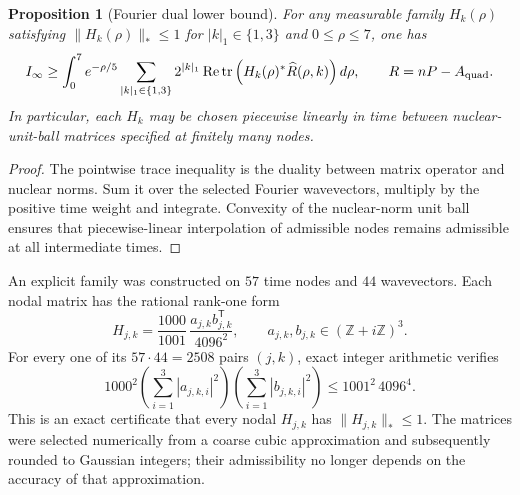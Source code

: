 \documentclass[11pt,a4paper]{article}
\newtheorem{proposition}[theorem]{Proposition}
\theoremstyle{remark}
\newcommand{\tr}{\operatorname{tr}}
\begin{document}
\begin{proposition}[Fourier dual lower bound]\label{prop:dual}
For any measurable family $H_k(\rho)$ satisfying $\|H_k(\rho)\|_*\leq1$ for $|k|_1\in\{1,3\}$ and $0\leq\rho\leq7$, one has
\begin{equation}\label{eq:dual}
I_\infty\geq
\int_0^7 e^{-\rho/5}\sum_{|k|_1\in\{1,3\}}2^{|k|_1}
\operatorname{Re}\tr\left(H_k(\rho)^*\widehat R(\rho,k)\right)d\rho,
\qquad R=nP-A_{\rm quad}.
\end{equation}
In particular, each $H_k$ may be chosen piecewise linearly in time between nuclear-unit-ball matrices specified at finitely many nodes.
\end{proposition}
\begin{proof}
The pointwise trace inequality is the duality between matrix operator and nuclear norms. Sum it over the selected Fourier wavevectors, multiply by the positive time weight and integrate. Convexity of the nuclear-norm unit ball ensures that piecewise-linear interpolation of admissible nodes remains admissible at all intermediate times.
\end{proof}

An explicit family was constructed on $57$ time nodes and $44$ wavevectors. Each nodal matrix has the rational rank-one form
\begin{equation}\label{eq:rankone}
H_{j,k}=\frac{1000}{1001}\,\frac{a_{j,k}b_{j,k}^{\mathsf T}}{4096^2},
\qquad a_{j,k},b_{j,k}\in(\mathbb Z+i\mathbb Z)^3.
\end{equation}
For every one of its $57\cdot44=2508$ pairs $(j,k)$, exact integer arithmetic verifies
\begin{equation}\label{eq:integer}
1000^2\left(\sum_{i=1}^3|a_{j,k,i}|^2\right)
\left(\sum_{i=1}^3|b_{j,k,i}|^2\right)
\leq 1001^2\,4096^4.
\end{equation}
This is an exact certificate that every nodal $H_{j,k}$ has $\|H_{j,k}\|_*\leq1$. The matrices were selected numerically from a coarse cubic approximation and subsequently rounded to Gaussian integers; their admissibility no longer depends on the accuracy of that approximation.
\end{document}
